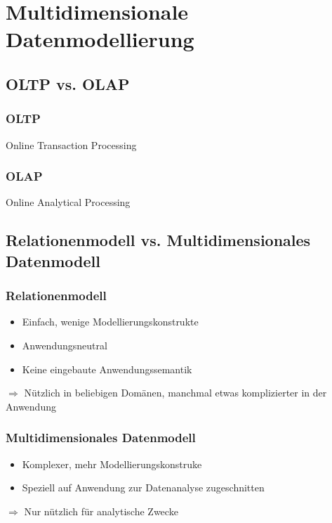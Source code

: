 \section{Multidimensionale Datenmodellierung}
\subsection{OLTP vs. OLAP}
\subsubsection{OLTP}
Online Transaction Processing
\subsubsection{OLAP}
Online Analytical Processing
\subsection{Relationenmodell vs. Multidimensionales Datenmodell}
\subsubsection{Relationenmodell}
\begin{itemize}
	\item Einfach, wenige Modellierungskonstrukte
	\item Anwendungsneutral
	\item Keine \glqq{}eingebaute\grqq{} Anwendungssemantik
\end{itemize} 
$\Rightarrow$ Nützlich in beliebigen Domänen, manchmal etwas komplizierter in der Anwendung
\subsubsection{Multidimensionales Datenmodell}
\begin{itemize}
	\item Komplexer, mehr Modellierungskonstruke
	\item Speziell auf Anwendung zur Datenanalyse zugeschnitten
\end{itemize}
$\Rightarrow$ Nur nützlich für analytische Zwecke
